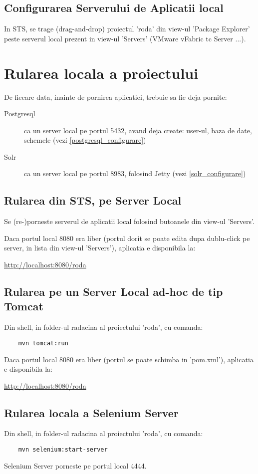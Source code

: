 
\subsection{Configurarea Serverului de Aplicatii local}
In STS, se trage (drag-and-drop) proiectul 'roda' din view-ul 'Package Explorer' 
peste serverul local prezent in view-ul 'Servers' (VMware vFabric tc Server ...).

\section{Rularea locala a proiectului}

De fiecare data, inainte de pornirea aplicatiei, trebuie sa fie deja pornite:
\begin{description}
\item[Postgresql] 
ca un server local pe portul 5432, avand deja create: 
user-ul, baza de date, schemele (vezi \ref{postgresql_configurare})
\item[Solr] 
ca un server local pe portul 8983, folosind Jetty (vezi \ref{solr_configurare})
\end{description}

\subsection{Rularea din STS, pe Server Local}
Se (re-)porneste serverul de aplicatii local folosind butoanele din view-ul
'Servers'.

Daca portul local 8080 era liber (portul dorit se poate edita dupa dublu-click pe
server, in lista din view-ul 'Servers'), aplicatia e disponibila la:

\url{http://localhost:8080/roda}

\subsection{Rularea pe un Server Local ad-hoc de tip Tomcat}
Din shell, in folder-ul radacina al proiectului 'roda', cu comanda:
\begin{lstlisting}
	mvn tomcat:run
\end{lstlisting}
Daca portul local 8080 era liber (portul se poate schimba in 'pom.xml'),
aplicatia e disponibila la:

\url{http://localhost:8080/roda}

\subsection{Rularea locala a Selenium Server}
Din shell, in folder-ul radacina al proiectului 'roda', cu comanda:
\begin{lstlisting}
	mvn selenium:start-server
\end{lstlisting}
Selenium Server porneste pe portul local 4444.

